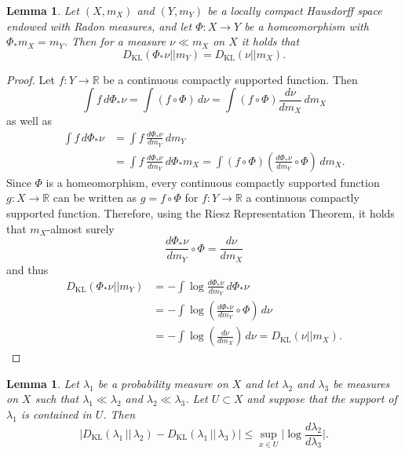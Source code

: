 \documentclass[10pt, english,oneside,reqno]{amsart}
\theoremstyle{plain}
\newtheorem{lemma}[theorem]{Lemma}
\theoremstyle{remark}
\numberwithin{equation}{section}
\numberwithin{figure}{section}
\newcommand{\R}{\mathbb{R}}
\newcommand{\Haarof}[1]{m_{#1}}
\begin{document}
\begin{lemma}\label{EntProductBound2}
    Let $(X, \Haarof{X})$ and $(Y, \Haarof{Y})$ be a locally compact Hausdorff space endowed with Radon measures, and let $\Phi: X \to Y$ be a homeomorphism with $\Phi_{*}\Haarof{X} = \Haarof{Y}$. Then for a measure $\nu \ll \Haarof{X}$ on $X$ it holds that $$D_{\mathrm{KL}}(\Phi_{*}\nu || m_Y) = D_{\mathrm{KL}}(\nu || m_X).$$ 
\end{lemma}

\begin{proof} Let $f:Y \to \R$ be a continuous compactly supported function. Then $$\int f \, d\Phi_{*}\nu =  \int (f\circ \Phi) \, d\nu = \int (f\circ \Phi) \frac{d\nu}{d\Haarof{X}} \, d\Haarof{X} $$ as well as 
\begin{align*}
    \int f \, d\Phi_{*}\nu &= \int f \, \frac{d\Phi_{*}\nu}{d\Haarof{Y}}  \, d\Haarof{Y} \\ &= \int f \, \frac{d\Phi_{*}\nu}{d\Haarof{Y}} \, d\Phi_*\Haarof{X} = \int (f\circ \Phi) \left(\frac{d\Phi_{*}\nu}{d\Haarof{Y}} \circ \Phi\right) \, d\Haarof{X}.
\end{align*}
    Since $\Phi$ is a homeomorphism, every continuous compactly supported function $g: X \to \R$ can be written as $g = f \circ \Phi$ for $f:Y \to \R$ a continuous compactly supported function. Therefore, using the Riesz Representation Theorem, it holds that $m_X$-almost surely $$\frac{d\Phi_{*}\nu}{dm_Y}\circ \Phi = \frac{d\nu}{dm_X}$$ and thus
    \begin{align*}
        D_{\mathrm{KL}}(\Phi_{*}\nu || m_Y) &= -\int \log \frac{d\Phi_{*}\nu}{dm_Y} \, d\Phi_{*}\nu \\
        &= -\int \log\left( \frac{d\Phi_{*}\nu}{dm_Y}\circ \Phi \right)  \, d\nu \\
        &= -\int \log\left(\frac{d\nu}{dm_X} \right) \, d\nu = D_{\mathrm{KL}}(\nu || m_X).
    \end{align*}
\end{proof}


\begin{lemma}\label{KLBound}
    Let $\lambda_1$ be a probability measure on $X$ and let $\lambda_2$ and $\lambda_3$ be measures on $X$ such that $\lambda_1 \ll \lambda_2$ and $\lambda_2 \ll \lambda_3$. Let $U \subset X$ and suppose that the support of $\lambda_1$ is contained in $U$. Then $$|D_{\mathrm{KL}}(\lambda_1 \,||\, \lambda_2) - D_{\mathrm{KL}}(\lambda_1 \,||\, \lambda_3)| \leq \sup_{x \in U} \bigg| \log \frac{d\lambda_2}{d\lambda_3}  \bigg|.$$
\end{lemma}
\end{document}
